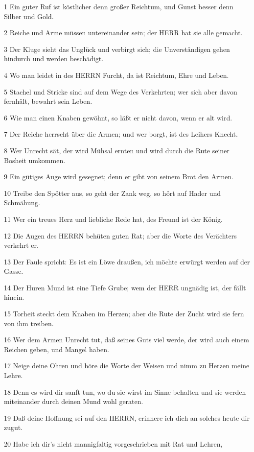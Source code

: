 \par 1 Ein guter Ruf ist köstlicher denn großer Reichtum, und Gunst besser denn Silber und Gold.
\par 2 Reiche und Arme müssen untereinander sein; der HERR hat sie alle gemacht.
\par 3 Der Kluge sieht das Unglück und verbirgt sich; die Unverständigen gehen hindurch und werden beschädigt.
\par 4 Wo man leidet in des HERRN Furcht, da ist Reichtum, Ehre und Leben.
\par 5 Stachel und Stricke sind auf dem Wege des Verkehrten; wer sich aber davon fernhält, bewahrt sein Leben.
\par 6 Wie man einen Knaben gewöhnt, so läßt er nicht davon, wenn er alt wird.
\par 7 Der Reiche herrscht über die Armen; und wer borgt, ist des Leihers Knecht.
\par 8 Wer Unrecht sät, der wird Mühsal ernten und wird durch die Rute seiner Bosheit umkommen.
\par 9 Ein gütiges Auge wird gesegnet; denn er gibt von seinem Brot den Armen.
\par 10 Treibe den Spötter aus, so geht der Zank weg, so hört auf Hader und Schmähung.
\par 11 Wer ein treues Herz und liebliche Rede hat, des Freund ist der König.
\par 12 Die Augen des HERRN behüten guten Rat; aber die Worte des Verächters verkehrt er.
\par 13 Der Faule spricht: Es ist ein Löwe draußen, ich möchte erwürgt werden auf der Gasse.
\par 14 Der Huren Mund ist eine Tiefe Grube; wem der HERR ungnädig ist, der fällt hinein.
\par 15 Torheit steckt dem Knaben im Herzen; aber die Rute der Zucht wird sie fern von ihm treiben.
\par 16 Wer dem Armen Unrecht tut, daß seines Guts viel werde, der wird auch einem Reichen geben, und Mangel haben.
\par 17 Neige deine Ohren und höre die Worte der Weisen und nimm zu Herzen meine Lehre.
\par 18 Denn es wird dir sanft tun, wo du sie wirst im Sinne behalten und sie werden miteinander durch deinen Mund wohl geraten.
\par 19 Daß deine Hoffnung sei auf den HERRN, erinnere ich dich an solches heute dir zugut.
\par 20 Habe ich dir's nicht mannigfaltig vorgeschrieben mit Rat und Lehren,
